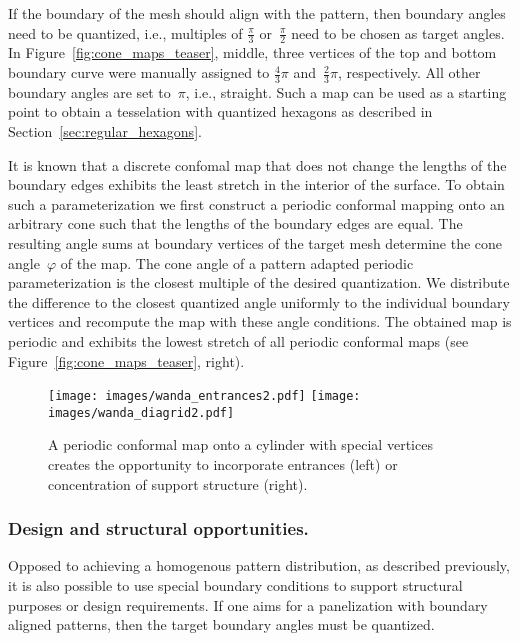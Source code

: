 \documentclass[Thesis.tex]{subfiles}
\begin{document}
If the boundary of the mesh should align with the pattern,
then boundary angles need to be quantized, i.e., multiples of
$\tfrac{\pi}{3}$ or~$\tfrac{\pi}{2}$ need to be chosen as target
angles. In Figure~\ref{fig:cone_maps_teaser}, middle, three vertices
of the top and bottom boundary curve were manually assigned to
$\tfrac{4}{3}\pi$ and~$\tfrac{2}{3}\pi$, respectively. All other
boundary angles are set to~$\pi$, i.e., straight.  Such a map can
be used as a starting point to obtain a tesselation with quantized
hexagons as described in Section~\ref{sec:regular_hexagons}.

It is known that a discrete confomal map that does not change the lengths of the 
boundary edges exhibits the least stretch in the interior of the surface.
To obtain such a parameterization we first construct a periodic conformal 
mapping onto an
arbitrary cone such that the lengths of the boundary edges are equal. The resulting angle sums at boundary vertices of the
target mesh determine the cone angle~$\varphi$ of the map. The cone angle of
a pattern adapted periodic parameterization is the closest multiple of the 
desired quantization. We distribute the difference to the closest
quantized angle uniformly to the individual boundary vertices and
recompute the map with these angle conditions. The obtained map is 
periodic and exhibits the lowest stretch of all periodic conformal maps (see
Figure~\ref{fig:cone_maps_teaser}, right).  

\begin{figure}[bt]
  \centering
  \texttt{[image: images/wanda\_entrances2.pdf]}
  \hspace{.5cm}
  \texttt{[image: images/wanda\_diagrid2.pdf]}
  \caption{A periodic conformal map onto a cylinder with special
    vertices creates the opportunity to incorporate entrances (left)
    or concentration of support structure (right).}
  \label{fig:entrance}
\end{figure}

\subsubsection{Design and structural opportunities.}
Opposed to achieving a homogenous pattern distribution, as described
previously, it is also possible to use special boundary conditions to
support structural purposes or design requirements. If one aims for a
panelization with boundary aligned patterns, then the target boundary
angles must be quantized.
\end{document}
